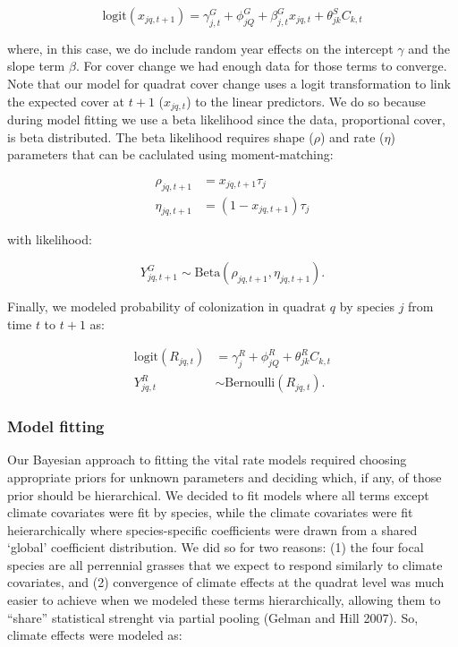 \documentclass[12pt,]{article}
\begin{document}
\begin{equation}
\text{logit}(x_{jq,t+1}) = \gamma^{G}_{j,t} + \phi^{G}_{jQ} + \beta^{G}_{j,t}x_{jq,t} + \theta^{S}_{jk}C_{k,t}
\end{equation}

where, in this case, we do include random year effects on the intercept
$\gamma$ and the slope term $\beta$. For cover change we had enough data
for those terms to converge. Note that our model for quadrat cover
change uses a logit transformation to link the expected cover at $t+1$
($x_{jq,t}$) to the linear predictors. We do so because during model
fitting we use a beta likelihood since the data, proportional cover, is
beta distributed. The beta likelihood requires shape ($\rho$) and rate
($\eta$) parameters that can be caclulated using moment-matching:

\begin{align}
\rho_{jq,t+1} &= x_{jq,t+1}\tau_{j} \\
\eta_{jq,t+1} &= (1-x_{jq,t+1})\tau_{j}
\end{align}

with likelihood:

\begin{equation}
Y^{G}_{jq,t+1} \sim \text{Beta}(\rho_{jq,t+1}, \eta_{jq,t+1}).
\end{equation}

Finally, we modeled probability of colonization in quadrat $q$ by
species $j$ from time $t$ to $t+1$ as:

\begin{align}
\text{logit}(R_{jq,t}) &= \gamma^{R}_{j} + \phi^{R}_{jQ} + \theta^{R}_{jk}C_{k,t} \\
Y^{R}_{jq,t} &\sim \text{Bernoulli}(R_{jq,t}).
\end{align}

\subsubsection{Model fitting}\label{model-fitting}

Our Bayesian approach to fitting the vital rate models required choosing
appropriate priors for unknown parameters and deciding which, if any, of
those prior should be hierarchical. We decided to fit models where all
terms except climate covariates were fit by species, while the climate
covariates were fit heierarchically where species-specific coefficients
were drawn from a shared `global' coefficient distribution. We did so
for two reasons: (1) the four focal species are all perrennial grasses
that we expect to respond similarly to climate covariates, and (2)
convergence of climate effects at the quadrat level was much easier to
achieve when we modeled these terms hierarchically, allowing them to
``share'' statistical strenght via partial pooling (Gelman and Hill
2007). So, climate effects were modeled as:
\end{document}

